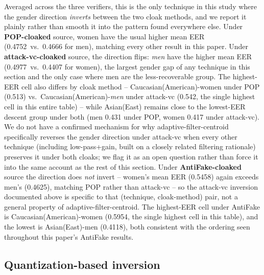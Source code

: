 \documentclass[11pt]{article}
\begin{document}
Averaged across the three verifiers, this is the only technique in this
study where the gender direction \emph{inverts} between the two cloak
methods, and we report it plainly rather than smooth it into the
pattern found everywhere else. Under \textbf{POP-cloaked} source, women
have the usual higher mean EER (0.4752~vs.\ 0.4666 for men), matching
every other result in this paper. Under \textbf{attack-vc-cloaked}
source, the direction flips: \emph{men} have the higher mean EER
(0.4977~vs.\ 0.4407 for women), the largest gender gap of any technique
in this section and the only case where men are the less-recoverable
group. The highest-EER cell also differs by cloak method --
Caucasian(American)-women under POP (0.513) vs.\
Caucasian(American)-\emph{men} under attack-vc (0.542, the single
highest cell in this entire table) -- while Asian(East) remains close
to the lowest-EER descent group under both (men 0.431 under POP,
women 0.417 under attack-vc). We do not have a confirmed mechanism for
why adaptive-filter-centroid specifically reverses the gender direction
under attack-vc when every other technique (including low-pass+gain,
built on a closely related filtering rationale) preserves it under both
cloaks; we flag it as an open question rather than force it into the
same account as the rest of this section. Under \textbf{AntiFake-cloaked}
source the direction does \emph{not} invert -- women's mean EER (0.5458)
again exceeds men's (0.4625), matching POP rather than attack-vc -- so
the attack-vc inversion documented above is specific to that
(technique, cloak-method) pair, not a general property of
adaptive-filter-centroid. The highest-EER cell under AntiFake is
Caucasian(American)-women (0.5954, the single highest cell in this
table), and the lowest is Asian(East)-men (0.4118), both consistent
with the ordering seen throughout this paper's AntiFake results.

\subsection{Quantization-based inversion}
\label{sec:restoration-quantization}
\end{document}
